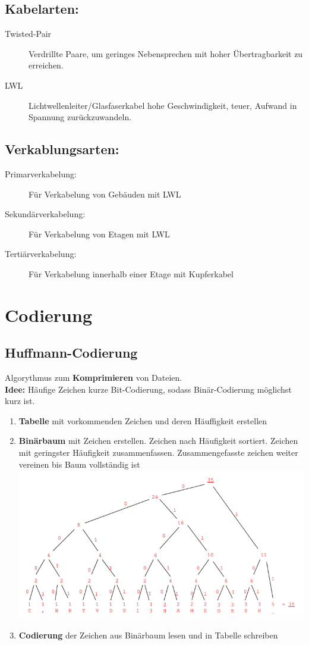 \documentclass[12pt,a4paper]{article}
\begin{document}
		\subsection{Kabelarten:}
		\begin{description}
			\item[Twisted-Pair] Verdrillte Paare, um geringes Nebensprechen mit hoher Übertragbarkeit zu erreichen.
			\item[LWL] Lichtwellenleiter/Glasfaserkabel hohe Geschwindigkeit, teuer, Aufwand in Spannung zurückzuwandeln.
		\end{description}

		\subsection{Verkablungsarten:}
		\begin{description}
			\item[Primarverkabelung: ] Für Verkabelung von Gebäuden mit LWL
			\item[Sekundärverkabelung: ] Für Verkabelung von Etagen mit LWL
			\item[Tertiärverkabelung: ] Für Verkabelung innerhalb einer Etage mit Kupferkabel
		\end{description}

	\section{Codierung}
		\subsection{Huffmann-Codierung}
			Algorythmus zum \textbf{Komprimieren} von Dateien.\\
			\textbf{Idee:} Häufige Zeichen kurze Bit-Codierung, sodass Binär-Codierung möglichst kurz ist.
			\begin{enumerate}
				\item \textbf{Tabelle} mit vorkommenden Zeichen und deren Häuffigkeit erstellen
				\item \textbf{Binärbaum} mit Zeichen erstellen. Zeichen nach Häufigkeit sortiert. Zeichen mit geringster Häufigkeit zusammenfassen. Zusammengefasste zeichen weiter vereinen bis Baum vollständig ist\\
				\includegraphics[scale=0.4]{Bilder/Huffmann-Baum.png}
				\item \textbf{Codierung} der Zeichen aus Binärbaum lesen und in Tabelle schreiben
			\end{enumerate}
\end{document}
